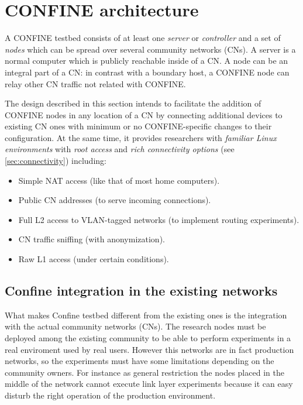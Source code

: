 \documentclass[conference]{IEEEtran}
\begin{document}




\section{CONFINE architecture}
\label{sec:confine-architecture}

A CONFINE testbed consists of at least one \emph{server} or \emph{controller}
and a set of \emph{nodes} which can be spread over several community networks
(CNs).  A server is a normal computer which is publicly reachable inside of a
CN.  A node can be an integral part of a CN: in contrast with a boundary host,
a CONFINE node can relay other CN traffic not related with CONFINE.

The design described in this section intends to facilitate the addition of
CONFINE nodes in any location of a CN by connecting additional devices to
existing CN ones with minimum or no CONFINE-specific changes to their
configuration.  At the same time, it provides researchers with \emph{familiar
  Linux environments} with \emph{root access} and \emph{rich connectivity
  options} (see \ref{sec:connectivity}) including:

\begin{itemize}
\item Simple NAT access (like that of most home computers).
\item Public CN addresses (to serve incoming connections).
\item Full L2 access to VLAN-tagged networks (to implement routing
  experiments).
\item CN traffic sniffing (with anonymization).
\item Raw L1 access (under certain conditions).
\end{itemize}

\subsection{Confine integration in the existing networks}

What makes Confine testbed different from the existing ones is the integration
with the actual community networks (CNs). The research nodes must be deployed among the existing 
community to be able to perform experiments in a real enviroment used by real users. However 
this networks are in fact production networks, so the experiments must have some limitations depending
on the community owners. For instance as general restriction the nodes placed in the middle of the network
cannot execute link layer experiments because it can easy disturb the right operation of the production
environment.
\end{document}
